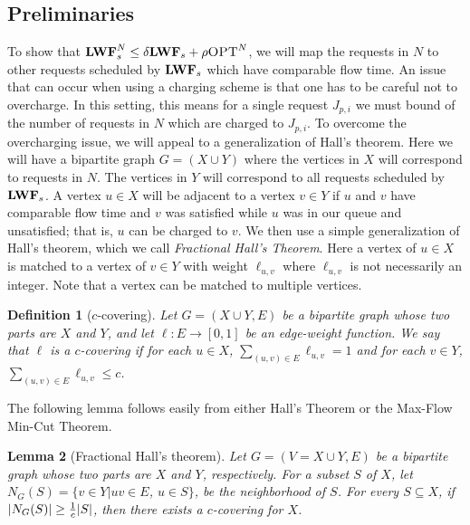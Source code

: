 \documentclass[11pt]{article}
\newtheorem{lemma}{Lemma}[section]
\newtheorem{definition}[lemma]{Definition}
\newcommand{\opt}{\textrm{\sc OPT}}
\begin{document}
\begin{titlepage}
\subsection{Preliminaries}
To show that $\lwf_s^{N} \leq \delta \lwf_s + \rho \opt^N$, we will map the requests in $N$ to other requests scheduled
by ${\texttt{\bf{LWF}}}_s$ which have comparable flow time.  An issue that can occur when using a charging scheme is that one has to
be careful not to overcharge.  In this setting, this means for a single request $J_{p,i }$ we must bound of the number
of requests in $N$ which are charged to $J_{p,i}$.  To overcome the overcharging issue, we will appeal to a
generalization of Hall's theorem.  Here we will have a bipartite graph $G = (X \cup Y)$ where the vertices in $X$ will
correspond to requests in $N$.  The vertices in $Y$ will correspond to all requests scheduled by ${\texttt{\bf{LWF}}}_s$.  A vertex $u
\in X$ will be adjacent to a vertex $v \in Y$ if $u$ and $v$ have comparable flow time and $v$ was satisfied while $u$
was in our queue and unsatisfied; that is, $u$ can be charged to $v$.  We then use a simple generalization of Hall's
theorem, which we call \emph{Fractional Hall's Theorem}. Here a vertex of $u \in X$ is matched to a vertex of $v \in Y$
with weight $\ell_{u,v}$ where $\ell_{u,v}$ is not necessarily an integer. Note that a vertex can be matched to
multiple vertices.
\vspace{-2mm}

\begin{definition} [$c$-covering]
  \label{def:covering} Let $G = (X \cup Y, E)$ be a bipartite graph
  whose two parts are $X$ and $Y$, and let $\ell : E \rightarrow
  [0,1]$ be an edge-weight function.  We say that $\ell$ is a
  $c$-covering if for each $u \in X$, $\sum_{(u,v) \in E} \ell_{u,v} =
  1$ and for each $v \in Y$, $\sum_{(u,v) \in E} \ell_{u,v} \leq c$.
\end{definition}


The following lemma follows easily from either Hall's Theorem or the Max-Flow Min-Cut Theorem.
\vspace{-1mm}
\begin{lemma}[Fractional Hall's theorem]
 \label{lem:Hall_thm}
 Let $G = (V = X \cup Y, E)$ be a bipartite graph whose two parts are
 $X$ and $Y$, respectively. For a subset $S$ of $X$, let $N_G(S) = \{v
 \in Y| uv \in E $, $ u \in S\}$, be the neighborhood of $S$. For
 every $S \subseteq X$, if $ |N_G(S)| \geq {1 \over c}|S|$, then there
 exists a $c$-covering for $X$.
\end{lemma}


\end{titlepage}
\end{document}
